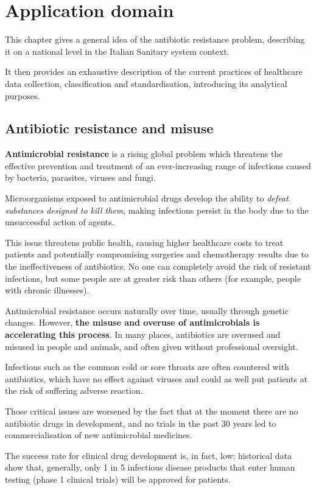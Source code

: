 \chapter{Application domain}
This chapter gives a general idea of the antibiotic resistance problem, describing it on a national level in the Italian Sanitary system context. 

It then provides an exhaustive description of the current practices of healthcare data collection, classification and standardisation, introducing its analytical purposes.

\section{Antibiotic resistance and misuse}
\textbf{Antimicrobial resistance} is a rising global problem which threatens the effective prevention and treatment of an ever-increasing range of infections caused by bacteria, parasites, viruses and fungi\cite{who}. 

Microorganisms exposed to antimicrobial drugs develop the ability to \textit{defeat substances designed to kill them}, making infections persist in the body due to the unsuccessful action of agents.

This issue threatens public health, causing higher healthcare costs to treat patients and potentially compromising surgeries and chemotherapy results due to the ineffectiveness of antibiotics. No one can completely avoid the risk of resistant infections, but some people are at greater risk than others (for example, people with chronic illnesses)\cite{cdc}.

Antimicrobial resistance occurs naturally over time, usually through genetic changes. However, \textbf{the misuse and overuse of antimicrobials is accelerating this process}. In many places, antibiotics are overused and misused in people and animals, and often given without professional oversight\cite{who}.

Infections such as the common cold or sore throats are often countered with antibiotics, which have no effect against viruses and could as well put patients at the risk of suffering adverse reaction\cite{bmj}.

Those critical issues are worsened by the fact that at the moment there are no antibiotic drugs in development, and no trials in the past 30 years led to commercialisation of new antimicrobial medicines\cite{aifa2017}. 

The success rate for clinical drug development is, in fact, low; historical data show that, generally, only 1 in 5 infectious disease products that enter human testing (phase 1 clinical trials) will be approved for patients\cite{pew}.

